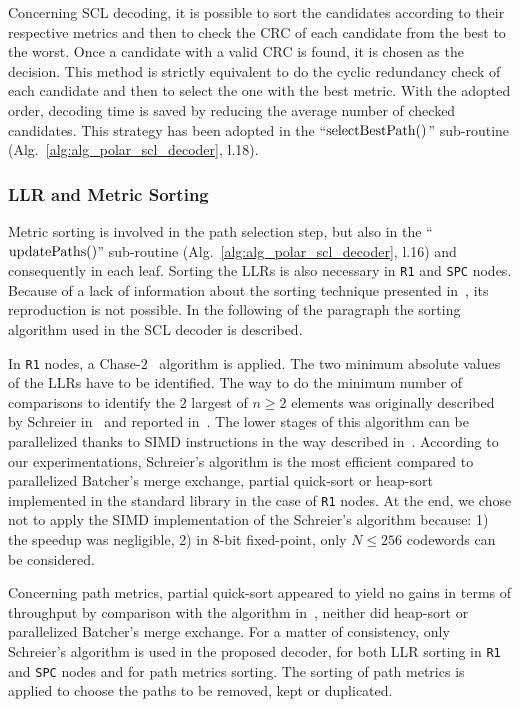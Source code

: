 Concerning SCL decoding, it is possible to sort the candidates according to
their respective metrics and then to check the CRC of each candidate from the
best to the worst. Once a candidate with a valid CRC is found, it is chosen as
the decision. This method is strictly equivalent to do the cyclic redundancy
check of each candidate and then to select the one with the best metric. With
the adopted order, decoding time is saved by reducing the average number of
checked candidates. This strategy has been adopted in the
``$\operatorname*{selectBestPath}()$'' sub-routine (Alg.~\ref{alg:alg_polar_scl_decoder},
l.18).

\subsubsection{LLR and Metric Sorting}
\label{sec:opt_polar_scl_sorting}

Metric sorting is involved in the path selection step, but also
in the ``$\operatorname*{updatePaths}()$'' sub-routine (Alg.~\ref{alg:alg_polar_scl_decoder},
l.16) and consequently in each leaf. Sorting the LLRs is also necessary in
\verb|R1| and \verb|SPC| nodes. Because of a lack of information about the
sorting technique presented in~\cite{Sarkis2016}, its reproduction is not
possible. In the following of the paragraph the sorting algorithm used in the
SCL decoder is described.

In \verb|R1| nodes, a Chase-$2$~\cite{Chase1972} algorithm is applied. The two
minimum absolute values of the LLRs have to be identified. The way to do the
minimum number of comparisons to identify the $2$ largest of $n\geq2$ elements
was originally described by Schreier in~\cite{Schreier1932} and reported
in~\cite{Knuth1973}. The lower stages of this algorithm can be parallelized
thanks to SIMD instructions in the way described in~\cite{Furtak2007}. According
to our experimentations, Schreier's algorithm is the most efficient compared to
parallelized Batcher's merge exchange, partial quick-sort or heap-sort
implemented in the \Cxx standard library in the case of \verb|R1| nodes. At the
end, we chose not to apply the SIMD implementation of the Schreier's algorithm
because: 1) the speedup was negligible, 2) in 8-bit fixed-point, only
$N \leq 256$ codewords can be considered.

Concerning path metrics, partial quick-sort appeared to yield no gains in terms
of throughput by comparison with the algorithm in~\cite{Schreier1932}, neither
did heap-sort or parallelized Batcher's merge exchange. For a matter of
consistency, only Schreier's algorithm is used in the proposed decoder, for both
LLR sorting in \verb|R1| and \verb|SPC| nodes and for path metrics sorting. The
sorting of path metrics is applied to choose the paths to be removed, kept or
duplicated.

